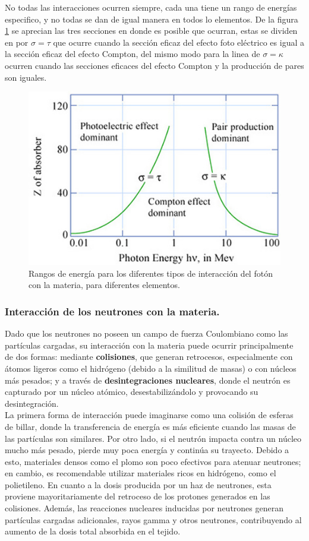 \documentclass[onecolumn,12pt]{article} %
\begin{document}
No todas las interacciones ocurren siempre, cada una tiene un rango de energías especifico, y no todas se dan de igual manera en todos lo elementos. De la figura \ref{fig:seccionefi} se aprecian las tres secciones en donde es posible que ocurran, estas se dividen en por $\sigma=\tau$ que ocurre cuando la sección eficaz del efecto foto eléctrico es igual a la sección eficaz del efecto Compton, del mismo modo para la linea de $\sigma=\kappa$ ocurren cuando las secciones eficaces del efecto Compton y la producción de pares son iguales. 
\begin{figure}[H]
    \centering
    \includegraphics[width=0.5\linewidth]{img_intro/seccionesEficacesDeLasInteracciones.png}
    \caption{Rangos de energía para los diferentes tipos de interacción del fotón con la materia, para diferentes elementos.}
    \label{fig:seccionefi}
\end{figure}



\subsubsection{Interacción de los neutrones con la materia.}
Dado que los neutrones no poseen un campo de fuerza Coulombiano como las partículas cargadas, su interacción con la materia puede ocurrir principalmente de dos formas: mediante \textbf{colisiones}, que generan retrocesos, especialmente con átomos ligeros como el hidrógeno (debido a la similitud de masas) o con núcleos más pesados; y a través de  \textbf{desintegraciones nucleares}, donde el neutrón es capturado por un núcleo atómico, desestabilizándolo y provocando su desintegración.\\

\noindent La primera forma de interacción puede imaginarse como una colisión de esferas  de billar, donde la transferencia de energía es más eficiente cuando las masas de las partículas son similares. Por otro lado, si el neutrón impacta contra un núcleo mucho más pesado, pierde muy poca energía y continúa su trayecto. Debido a esto, materiales densos como el plomo son poco efectivos para atenuar neutrones; en cambio, es recomendable utilizar materiales ricos en hidrógeno, como el polietileno. En cuanto a la dosis producida por un haz de neutrones, esta proviene mayoritariamente del retroceso de los protones generados en las colisiones. Además, las reacciones nucleares inducidas por neutrones generan partículas cargadas adicionales, rayos gamma y otros neutrones, contribuyendo al aumento de la dosis total absorbida en el tejido.
\end{document}
